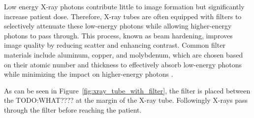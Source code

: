 Low energy X-ray photons contribute little to image formation but significantly
increase patient dose. Therefore, X-ray tubes are often equipped with filters to
selectively attenuate these low-energy photons while allowing higher-energy
photons to pass through. This process, known as beam hardening, improves image
quality by reducing scatter and enhancing contrast. Common filter materials
include aluminum, copper, and molybdenum, which are chosen based on their atomic
number and thickness to effectively absorb low-energy photons while minimizing
the impact on higher-energy photons \cite{poludniowski2022calculating}.

As can be seen in Figure~\ref{fig:xray_tube_with_filter}, the filter is placed
between the TODO:WHAT???? at the margin of the X-ray tube. Followingly X-rays pass through the
filter before reaching the patient.

